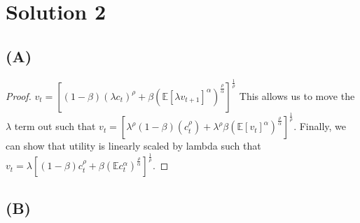 \documentclass[10pt,a4paper]{article}
\begin{document}
\section*{Solution 2}
  \subsection*{(A)}
    \begin{proof}
      $v_t = [(1-\beta)(\lambda c_t)^{\rho} + \beta(\mathbb{E}[\lambda v_{t+1}]^{\alpha})^{\frac{\rho}{\alpha}}]^{\frac{1}{\rho}}$  This allows us to move the $\lambda$ term out such that $v_t = [\lambda^{\rho}(1-\beta)(c_t^{\rho}) + \lambda^{\rho}\beta(\mathbb{E}[v_t]^{\alpha})^{\frac{\rho}{\alpha}}]^{\frac{1}{\rho}}$. Finally, we can show that utility is linearly scaled by lambda such that $v_t = \lambda[(1-\beta)c_t^{\rho}+\beta(\mathbb{E}c_t^{\alpha})^{\frac{\rho}{\alpha}}]^{\frac{1}{\rho}}$.
    \end{proof}
  \subsection*{(B)}
    
\end{document}
